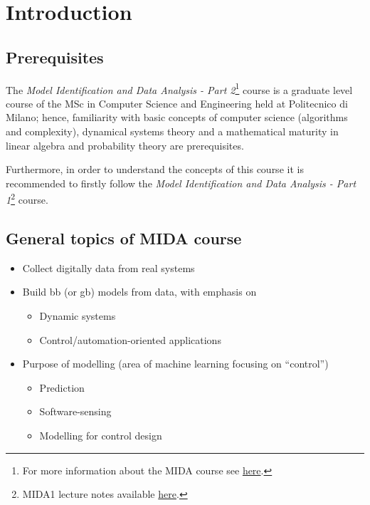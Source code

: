 \setcounter{chapter}{-1}
\chapter{Introduction}

\section{Prerequisites}
The \emph{Model Identification and Data Analysis - Part 2}\footnote{For more information about the MIDA course see \href{https://www4.ceda.polimi.it/manifesti/manifesti/controller/ManifestoPublic.do?EVN_DETTAGLIO_RIGA_MANIFESTO=evento&k_corso_la=481&k_indir=T2A&idItemOfferta=156912&idGruppo=4332&idRiga=271034&codDescr=051587&semestre=2&aa=2021&lang=EN&jaf_currentWFID=main}{here}.} course is a graduate level course of the MSc in Computer Science and Engineering held at Politecnico di Milano; hence, familiarity with basic concepts of computer science (algorithms and complexity), dynamical systems theory and a
mathematical maturity in linear algebra and probability theory are prerequisites. 

Furthermore, in order to understand the concepts of this course it is recommended to firstly follow the \emph{Model Identification and Data Analysis - Part 1}\footnote{MIDA1 lecture notes available \href{https://github.com/teobucci/mida/releases}{here}.} course.

\section{General topics of MIDA course}

\begin{itemize}
    \item Collect digitally data from real systems
    \item Build \acrfull{bb} (or \acrfull{gb}) models from data, with emphasis on
    \begin{itemize}
        \item Dynamic systems
        \item Control/automation-oriented applications
    \end{itemize}
    \item Purpose of modelling (area of machine learning focusing on ``control'')
    \begin{itemize}
        \item Prediction
        \item Software-sensing
        \item Modelling for control design
    \end{itemize}
\end{itemize}

